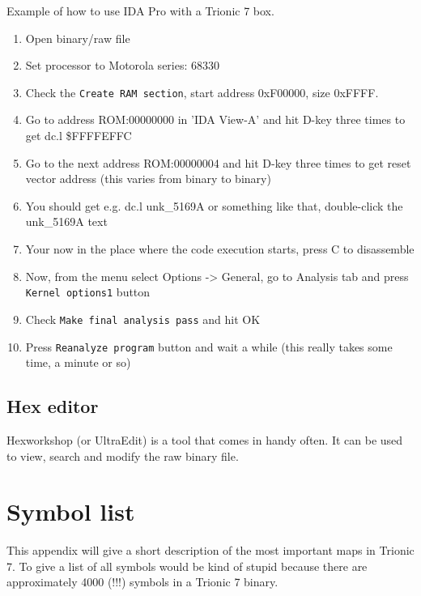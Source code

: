\documentclass[11pt,a4paper]{book}
\begin{document}
Example of how to use IDA Pro with a Trionic 7 box.
\begin{enumerate}
    \item Open binary/raw file
    \item Set processor to Motorola series: 68330
    \item Check the \texttt{Create RAM section}, start address 0xF00000, size 0xFFFF.
    \item Go to address ROM:00000000 in 'IDA View-A' and hit D-key three times
        to get dc.l \$FFFFEFFC
    \item Go to the next address ROM:00000004 and hit D-key three times to get reset vector address (this
varies from binary to binary)
\item You should get e.g. dc.l unk\_5169A or something like that, double-click
    the unk\_5169A text
\item Your now in the place where the code execution starts, press C to disassemble
\item Now, from the menu select Options -> General, go to Analysis tab and press
    \texttt{Kernel options1} button
\item Check \texttt{Make final analysis pass} and hit OK
\item Press \texttt{Reanalyze program} button and wait a while (this really takes some time, a minute or so)
\end{enumerate}

\section{Hex editor}
Hexworkshop (or UltraEdit) is a tool that comes in handy often. It can be used to view, search and
modify the raw binary file.

\appendix
\chapter{Symbol list}
This appendix will give a short description of the most important maps in
Trionic 7. To give a list of all symbols would be kind of stupid because there
are approximately 4000 (!!!) symbols in a Trionic 7 binary.
\end{document}
